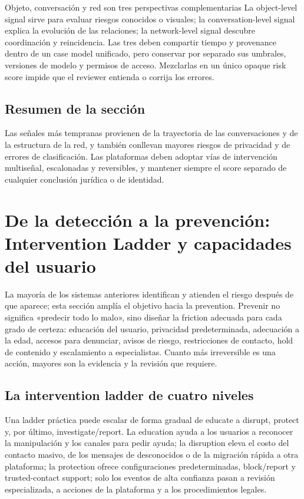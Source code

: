 \documentclass[a4paper]{article}
\begin{document}
\begin{importantbox}{Objeto, conversación y red son tres perspectivas complementarias}
La object-level signal sirve para evaluar riesgos conocidos o visuales; la conversation-level signal explica la evolución de las relaciones; la network-level signal descubre coordinación y reincidencia. Las tres deben compartir tiempo y provenance dentro de un case model unificado, pero conservar por separado sus umbrales, versiones de modelo y permisos de acceso. Mezclarlas en un único opaque risk score impide que el reviewer entienda o corrija los errores.
\end{importantbox}

\subsection{Resumen de la sección}

Las señales más tempranas provienen de la trayectoria de las conversaciones y de la estructura de la red, y también conllevan mayores riesgos de privacidad y de errores de clasificación. Las plataformas deben adoptar vías de intervención multiseñal, escalonadas y reversibles, y mantener siempre el score separado de cualquier conclusión jurídica o de identidad.
\section{De la detección a la prevención: Intervention Ladder y capacidades del usuario}

La mayoría de los sistemas anteriores identifican y atienden el riesgo después de que aparece; esta sección amplía el objetivo hacia la prevention. Prevenir no significa «predecir todo lo malo», sino diseñar la friction adecuada para cada grado de certeza: educación del usuario, privacidad predeterminada, adecuación a la edad, accesos para denunciar, avisos de riesgo, restricciones de contacto, hold de contenido y escalamiento a especialistas. Cuanto más irreversible es una acción, mayores son la evidencia y la revisión que requiere.

\subsection{La intervention ladder de cuatro niveles}

Una ladder práctica puede escalar de forma gradual de educate a disrupt, protect y, por último, investigate/report. La education ayuda a los usuarios a reconocer la manipulación y los canales para pedir ayuda; la disruption eleva el costo del contacto masivo, de los mensajes de desconocidos o de la migración rápida a otra plataforma; la protection ofrece configuraciones predeterminadas, block/report y trusted-contact support; solo los eventos de alta confianza pasan a revisión especializada, a acciones de la plataforma y a los procedimientos legales.
\end{document}
